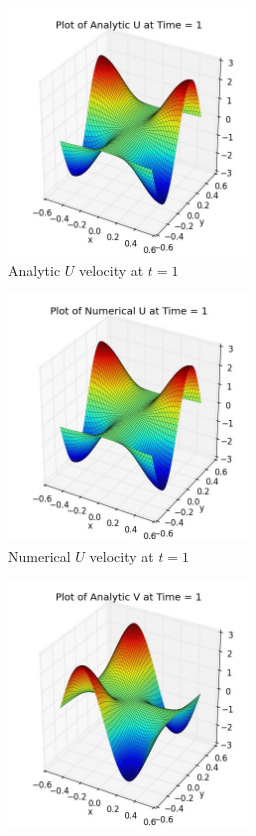 \begin{figure}[H]
	\centering
	\begin{subfigure}[t]{2.5in}
		\centering
		\includegraphics[width=2.5in]{figures/Pm1b_pf2b_U_exact_t_1_grid_60.jpg}
		\caption{Analytic $U$ velocity at $t=1$}\label{fig:6.7a}		
	\end{subfigure}
	\quad
	\begin{subfigure}[t]{2.5in}
		\centering
		\includegraphics[width=2.5in]{figures/Pm1b_pf2b_uf_t_1_grid_60.jpg}
		\caption{Numerical $U$ velocity at $t=1$}\label{fig:6.7b}
	\end{subfigure}
	\quad
	\begin{subfigure}[t]{2.5in}
		\centering
		\includegraphics[width=2.5in]{figures/Pm1b_pf2b_V_exact_t_1_grid_60.jpg}

\end{subfigure}
\end{figure}
